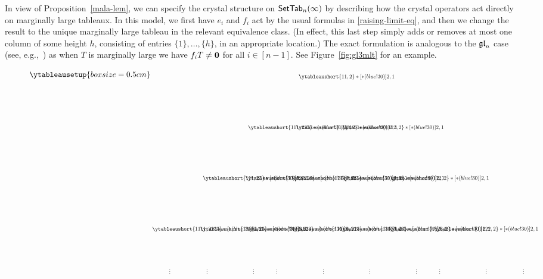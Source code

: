 \documentclass[11pt]{article}
\begin{document}
In view of Proposition~\ref{mala-lem}, we can specify the crystal structure on $\mathsf{SetTab}_n(\infty)$ by describing how the crystal operators act directly  on marginally large tableaux.
In this model,  we first have $e_i$ and $ f_i$ act by the usual formulas in \eqref{raising-limit-eq},
and then we change the result to the unique marginally large tableau in the relevant equivalence class.
(In effect, this last step simply adds or removes at most one column of some height $h$, consisting of entries $\{1\}, \dotsc, \{h\}$,  in an appropriate location.)
The exact formulation is analogous to the $\mathfrak{gl}_n$ case (see, e.g.,~\cite{HL08}) as when $T$ is marginally large we have  $f_i T \neq \boldsymbol{0}$ for all $i \in [n-1]$.
See Figure~\ref{fig:gl3mlt} for an example.


\begin{figure}[t]
\[
\ytableausetup{boxsize=0.5cm}
    \begin{tikzpicture}[xscale=2.1, yscale=2.3,>=latex,every node/.style={scale=0.7},baseline=0]
\node at (0,0) (A1) {$\ytableaushort{11,2} *[*(blue!30)]{2,1}$};
%
\node at (-1,-1) (A2) {$\ytableaushort{111,2{23}} *[*(blue!30)]{3,1}$};
\node at (0,-1) (B2) {$\ytableaushort{11{13},2} *[*(blue!30)]{2,1}$};
\node at (1,-1) (C2) {$\ytableaushort{11{12},2} *[*(blue!30)]{2,1}$};
%
\node at (-2,-2) (A3)  {$\ytableaushort{111,23} *[*(blue!30)]{3,1}$};
\node at (-1,-2) (B3) {$\ytableaushort{111{12},2{23}} *[*(blue!30)]{3,1}$};
\node at (0,-2) (C3) {$\ytableaushort{111{13},2{23}} *[*(blue!30)]{3,1}$};
\node at (1,-2) (D3) {$\ytableaushort{11{\scalebox{.8}{123}},2} *[*(blue!30)]{2,1}$};
\node at (2,-2) (E3) {$\ytableaushort{112,2} *[*(blue!30)]{2,1}$};
%
\node at (-2,-3) (A4) {$\ytableaushort{111{12},23} *[*(blue!30)]{3,1}$};
\node at (-3,-3) (B4) {$\ytableaushort{1111,2{23}3} *[*(blue!30)]{4,1}$};
\node at (-1,-3) (C4) {$\ytableaushort{1112,2{23}} *[*(blue!30)]{3,1}$};
\node at (0,-3) (D4) {$\ytableaushort{111{\scalebox{.8}{123}},2{23}} *[*(blue!30)]{3,1}$};
\node at (1,-3) (H4) {$\ytableaushort{111{13},23} *[*(blue!30)]{3,1}$};  %
\node at (2,-3) (E4) {$\ytableaushort{11{23},2} *[*(blue!30)]{2,1}$};
\node at (3,-3) (F4) {$\ytableaushort{11{12}2,2} *[*(blue!30)]{2,1}$};
%
\node at (-3.8,-3.8) (C5) {$\vdots$};
\node at (-3,-3.8) (B5) {$\vdots$};
\node at (-2,-3.8) (A5) {$\vdots$};
\node at (-1.5,-3.8) (D5) {$\vdots$};
\node at (-0.5,-3.8) (E5) {$\vdots$};
\node at (0.5,-3.8) (F5) {$\vdots$};
\node at (1.5,-3.8) (J5) {$\vdots$};  %
\node at (2,-3.8) (G5) {$\vdots$};
\node at (3,-3.8) (H5) {$\vdots$};
\node at (3.8,-3.8) (I5) {$\vdots$};

\end{tikzpicture}\]
\end{figure}
\end{document}
